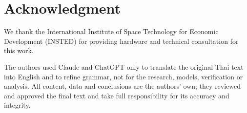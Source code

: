 \documentclass[conference,a4paper]{IEEEtran}
\newif\ifanon
\begin{document}
\section*{Acknowledgment}
\ifanon
The authors thank the institute that provided hardware and technical consultation for this work; its name is withheld for double-anonymous review.
\else
We thank the International Institute of Space Technology for Economic Development (INSTED) for providing hardware and technical consultation for this work.
\fi
The authors used Claude and ChatGPT only to translate the original Thai text into English and to refine grammar, not for the research, models, verification or analysis. All content, data and conclusions are the authors' own; they reviewed and approved the final text and take full responsibility for its accuracy and integrity.

\balance


\end{document}
